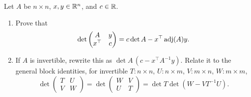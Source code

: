 \begin{problem}\label{ex:05:bordered-adjugate}
Let \(A\) be \(n\times n\), \(x,y\in\mathbb R^n\), and \(c\in\mathbb R\).
\begin{enumerate}
\item Prove that
\[
\det\begin{pmatrix}A&y\\x^\top&c\end{pmatrix}
=c\det A-x^\top\operatorname{adj}(A)y.
\]
\item If \(A\) is invertible, rewrite this as
\(\det A\,(c-x^\top A^{-1}y)\).
Relate it to the general block identities, for invertible \(T:n\times n\),
\(U:n\times m\), \(V:m\times n\), \(W:m\times m\),
\[
\det\begin{pmatrix}T&U\\V&W\end{pmatrix}
=\det\begin{pmatrix}W&V\\U&T\end{pmatrix}
=\det T\det(W-VT^{-1}U).
\]
\end{enumerate}
\end{problem}
